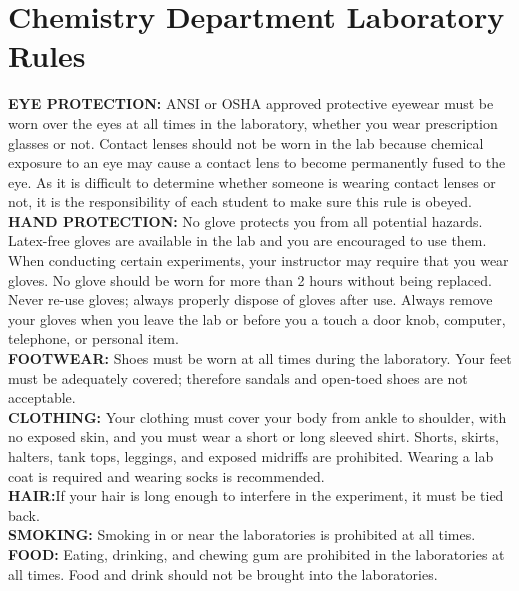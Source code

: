 \documentclass[12pt]{article}
\begin{document}
\section{Chemistry Department Laboratory Rules}
\textbf{ EYE PROTECTION:} ANSI or OSHA approved protective eyewear must be worn over the eyes at all times in the laboratory, whether you wear prescription glasses or not. Contact lenses should not be worn in the lab because chemical exposure to an eye may cause a contact lens to become permanently fused to the eye. As it is difficult to determine whether someone is wearing contact lenses or not, it is the responsibility of each student to make sure this rule is obeyed.\\
\newline %
\textbf{HAND PROTECTION:} No glove protects you from all potential hazards. Latex-free gloves are available in the lab and you are encouraged to use them. When conducting certain experiments, your instructor may require that you wear gloves. No glove should be worn for more than 2 hours without being replaced. Never re-use gloves; always properly dispose of gloves after use. Always remove your gloves when you leave the lab or before you a touch a door knob, computer, telephone, or personal item.\\
\newline %
\textbf{ FOOTWEAR:} Shoes must be worn at all times during the laboratory. Your feet must be adequately covered; therefore sandals and open-toed shoes are not acceptable.\\
\newline %
\textbf{ CLOTHING:} Your clothing must cover your body from ankle to shoulder, with no exposed skin, and you must wear a short or long sleeved shirt. Shorts, skirts, halters, tank tops, leggings, and exposed midriffs are prohibited. Wearing a lab coat is required and wearing socks is recommended.\\
\newline %
\textbf{HAIR:}If your hair is long enough to interfere in the experiment, it must be tied back.\\
\newline %
\textbf{ SMOKING:} Smoking in or near the laboratories is prohibited at all times.\\
\newline %
\textbf{ FOOD:} Eating, drinking, and chewing gum are prohibited in the laboratories at all times. Food and drink should not be brought into the laboratories.\\
\end{document}
